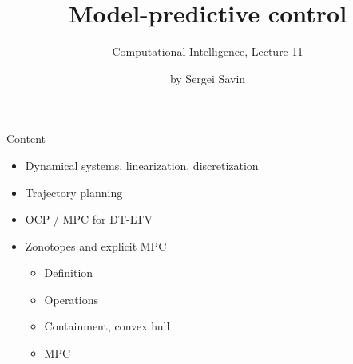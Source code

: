 \documentclass{beamer}
\title{Model-predictive control}
\subtitle{Computational Intelligence, Lecture 11}
\author{by Sergei Savin}
\date{\mydate}
\begin{document}
\maketitle


\begin{frame}{Content}

\begin{itemize}
\item  Dynamical systems, linearization, discretization
\item Trajectory planning
\item OCP / MPC for DT-LTV
\item Zonotopes and explicit MPC
	\begin{itemize}
		\item  Definition
		\item  Operations
		\item Containment, convex hull
		\item MPC
	\end{itemize}
\end{itemize}

\end{frame}
\end{document}

